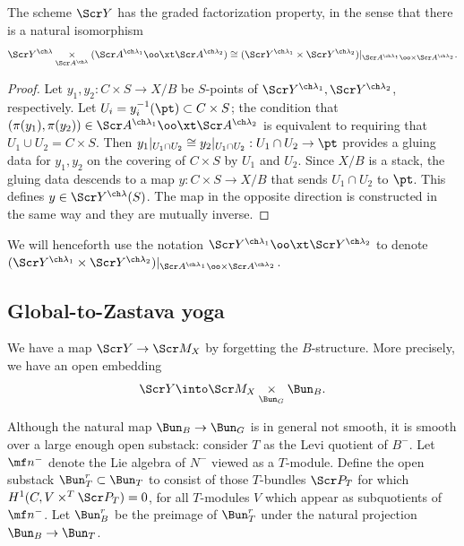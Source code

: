 \begin{prop}
\notready \label{prop:factorization}
The scheme $\Scr Y$ has the graded factorization property, in the sense
that there is a natural isomorphism
\[
\Scr Y^{\ch\lambda}  \underset{\Scr A^{\ch\lambda}}\times
(\Scr A^{\ch\lambda_1} \oo\xt \Scr A^{\ch\lambda_2})
\cong
(\Scr Y^{\ch\lambda_1} \times \Scr Y^{\ch\lambda_2})|_{\Scr A^{\ch\lambda_1}\oo\times \Scr A^{\ch\lambda_2}}.
\]
\end{prop}
\begin{proof}
Let $y_1, y_2 : C \times S \to X/B$ be $S$-points of $\Scr Y^{\ch\lambda_1}, \Scr Y^{\ch\lambda_2}$, respectively.
Let $U_i = y_i^{-1}(\pt)\subset C\times S$; the condition that $(\pi(y_1),\pi(y_2))\in
\Scr A^{\ch\lambda_1} \oo\xt \Scr A^{\ch\lambda_2}$ is equivalent to
requiring that $U_1 \cup U_2 = C\times S$.
Then
$y_1|_{U_1\cap U_2} \cong y_2|_{U_1\cap U_2} : U_1\cap U_2 \to \pt$
provides a gluing
data for $y_1,y_2$ on the covering of $C\times S$ by $U_1$ and $U_2$.
Since $X/B$ is a stack, the gluing data descends to a map
$y : C\times S \to X/B$ that sends $U_1\cap U_2$ to $\pt$.
This defines $y\in \Scr Y^{\ch\lambda}(S)$.
The map in the opposite direction
is constructed in the same way and they are mutually inverse.
\end{proof}

We will henceforth use the notation
$\Scr Y^{\ch\lambda_1} \oo\xt \Scr Y^{\ch\lambda_2}$ to denote
$(\Scr Y^{\ch\lambda_1} \times \Scr Y^{\ch\lambda_2})|_{\Scr A^{\ch\lambda_1}\oo\times \Scr A^{\ch\lambda_2}}$.

\subsection{Global-to-Zastava yoga}

We have a map $\Scr Y \to \Scr M_{X}$ by forgetting the $B$-structure.
More precisely, we have an open embedding
\begin{equation}
    \Scr Y \into \Scr M_{X} \underset{\Bun_G}\times \Bun_B.
\end{equation}

Although the natural map $\Bun_B \to \Bun_G$ is in general not smooth,
it is smooth over a large enough open substack:
consider $T$ as the Levi quotient of $B^-$. Let $\mf n^-$ denote the Lie algebra of $N^-$
viewed as a $T$-module. Define the open substack $\Bun^r_T \subset \Bun_T$ to consist
of those $T$-bundles $\Scr P_T$ for which
$H^1(C, V \times^T \Scr P_T)=0$, for all $T$-modules $V$ which appear as
subquotients of $\mf n^-$. Let
$\Bun_B^r$ be the preimage of $\Bun^r_T$ under the natural projection
$\Bun_B \to \Bun_T$.

